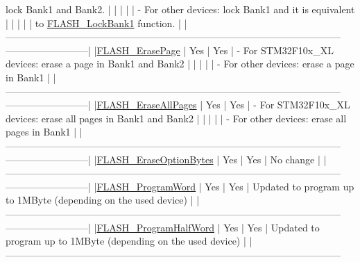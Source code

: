 \begin{DoxyCode}
       lock Bank1 and Bank2.              |
  |                                    |            |               | - For other devices: lock Bank1 and 
      it is equivalent           |
  |                                    |            |               |   to 
      \hyperlink{group___f_l_a_s_h___exported___functions_gafe4188ab9eb12c046970660f65a3faf9}{FLASH\_LockBank1} \textcolor{keyword}{function}.                                 |
  |--------------------------------------------------------------------------------------------------------
      --------------------------|
  |\hyperlink{group___f_l_a_s_h___exported___functions_ga13a2ca18bfb3d5fb827a2751799f8451}{FLASH\_ErasePage}                     |    Yes     |      Yes      | - For STM32F10x\_XL 
      devices: erase a page in Bank1 and Bank2    |
  |                                    |            |               | - For other devices: erase a page in 
      Bank1                     |
  |--------------------------------------------------------------------------------------------------------
      --------------------------|
  |\hyperlink{group___f_l_a_s_h___exported___functions_gab2e6dea62c72b3e47c17512579d37498}{FLASH\_EraseAllPages}                 |    Yes     |      Yes      | - For STM32F10x\_XL
       devices: erase all pages in Bank1 and Bank2 |
  |                                    |            |               | - For other devices: erase all pages 
      in Bank1                  |
  |--------------------------------------------------------------------------------------------------------
      --------------------------|
  |\hyperlink{group___f_l_a_s_h___exported___functions_ga152768609e85d74a9d8474be8dc2874b}{FLASH\_EraseOptionBytes}              |    Yes     |      Yes      | No change      
                                                      |
  |--------------------------------------------------------------------------------------------------------
      --------------------------|
  |\hyperlink{group___f_l_a_s_h___exported___functions_gaac9a2f400b92537bd42a6bd7cc237b11}{FLASH\_ProgramWord}                   |    Yes     |      Yes      | Updated to program 
      up to 1MByte (depending on the used device) |
  |--------------------------------------------------------------------------------------------------------
      --------------------------|
  |\hyperlink{group___f_l_a_s_h___exported___functions_ga5c1336f667950a8765887228f1d0d501}{FLASH\_ProgramHalfWord}               |    Yes     |      Yes      | Updated to 
      program up to 1MByte (depending on the used device) |
  |--------------------------------------------------------------------------------------------------------

\end{DoxyCode}
